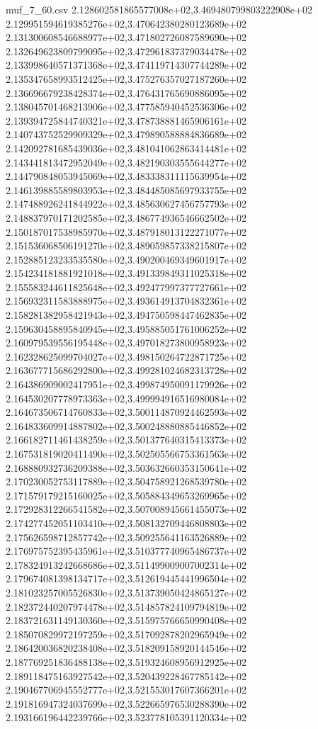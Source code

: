 \begin{filecontents*}{muf_7_60.csv}
2.128602581865577008e+02,3.469480799803222908e+02
2.129951594619385276e+02,3.470642380280123689e+02
2.131300608546688977e+02,3.471802726087589690e+02
2.132649623809799095e+02,3.472961837379034478e+02
2.133998640571371368e+02,3.474119714307744289e+02
2.135347658993512425e+02,3.475276357027187260e+02
2.136696679238428374e+02,3.476431765690886095e+02
2.138045701468213906e+02,3.477585940452536306e+02
2.139394725844740321e+02,3.478738881465906161e+02
2.140743752529909329e+02,3.479890588884836689e+02
2.142092781685439036e+02,3.481041062863414481e+02
2.143441813472952049e+02,3.482190303555644277e+02
2.144790848053945069e+02,3.483338311115639954e+02
2.146139885589803953e+02,3.484485085697933755e+02
2.147488926241844922e+02,3.485630627456757793e+02
2.148837970171202585e+02,3.486774936546662502e+02
2.150187017538985970e+02,3.487918013122271077e+02
2.151536068506191270e+02,3.489059857338215807e+02
2.152885123233535580e+02,3.490200469349601917e+02
2.154234181881921018e+02,3.491339849311025318e+02
2.155583244611825648e+02,3.492477997377727661e+02
2.156932311583888975e+02,3.493614913704832361e+02
2.158281382958421943e+02,3.494750598447462835e+02
2.159630458895840945e+02,3.495885051761006252e+02
2.160979539556195448e+02,3.497018273800958923e+02
2.162328625099704027e+02,3.498150264722871725e+02
2.163677715686292800e+02,3.499281024682313728e+02
2.164386909002417951e+02,3.499874950091179926e+02
2.164530207778973363e+02,3.499994916516980084e+02
2.164673506714760833e+02,3.500114870924462593e+02
2.164833609914887802e+02,3.500248880885446852e+02
2.166182711461438259e+02,3.501377640315413373e+02
2.167531819020411490e+02,3.502505566753361563e+02
2.168880932736209388e+02,3.503632660353150641e+02
2.170230052753117889e+02,3.504758921268539780e+02
2.171579179215160025e+02,3.505884349653269965e+02
2.172928312266541582e+02,3.507008945661455073e+02
2.174277452051103410e+02,3.508132709446808803e+02
2.175626598712857742e+02,3.509255641163526889e+02
2.176975752395435961e+02,3.510377740965486737e+02
2.178324913242668686e+02,3.511499009007002314e+02
2.179674081398134717e+02,3.512619445441996504e+02
2.181023257005526830e+02,3.513739050424865127e+02
2.182372440207974478e+02,3.514857824109794819e+02
2.183721631149130360e+02,3.515975766650990408e+02
2.185070829972197259e+02,3.517092878202965949e+02
2.186420036820238408e+02,3.518209158920144546e+02
2.187769251836488138e+02,3.519324608956912925e+02
2.189118475163927542e+02,3.520439228467785142e+02
2.190467706945552777e+02,3.521553017607366201e+02
2.191816947324037699e+02,3.522665976530288390e+02
2.193166196442239766e+02,3.523778105391120334e+02

\end{filecontents*}
